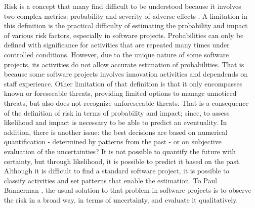 Risk is a concept that many find difficult to be understood because it involves two complex metrics: probability and severity of adverse effects \cite{Haimes2009}. A limitation in this definition is the practical difficulty of estimating the probability and impact of various risk factors, especially in software projects. Probabilities can only be defined with significance for activities that are repeated many times under controlled conditions. However, due to the unique nature of some software projects, its activities do not allow accurate estimation of probabilities. That is because some software projects involves innovation activities and  dependends on staff experience. Other limitation of that definition is that it only encompasses known or foreseeable threats, providing limited options to manage unnoticed threats, but also does not recognize unforeseeable threats. That is a consequence of the definition of risk in terms of probability and impact; since, to assess likelihood and impact is necessary to be able to predict an eventuality. In addition, there is another issue: the best decisions are based on numerical quantification - determined by patterns from the past - or on subjective evaluation of the uncertainties? It is not possible to quantify the future with certainty, but through likelihood, it is possible to predict it based on the past. Although it is difficult to find a standard software project, it is possible to classify activities and set patterns that enable the estimation. To Paul Bannerman \cite{bannerman2008risk}, the usual solution to that problem in software projects is to observe the risk in a broad way, in terms of uncertainty, and evaluate it qualitatively.

